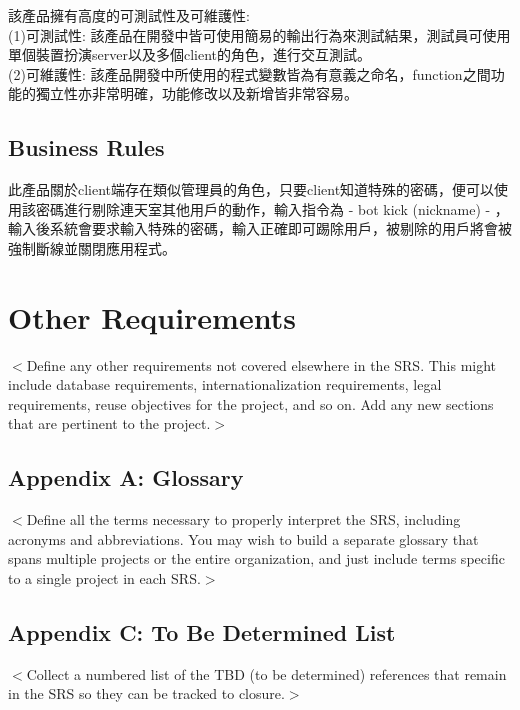 \documentclass{scrreprt}
\begin{document}
\begin{CJK}{UTF8}{bkai}
該產品擁有高度的可測試性及可維護性: \\
(1)可測試性: 該產品在開發中皆可使用簡易的輸出行為來測試結果，測試員可使用單個裝置扮演server以及多個client的角色，進行交互測試。\\
(2)可維護性: 該產品開發中所使用的程式變數皆為有意義之命名，function之間功能的獨立性亦非常明確，功能修改以及新增皆非常容易。\\

\section{Business Rules}
此產品關於client端存在類似管理員的角色，只要client知道特殊的密碼，便可以使用該密碼進行剔除連天室其他用戶的動作，輸入指令為 - bot kick (nickname) - ，輸入後系統會要求輸入特殊的密碼，輸入正確即可踢除用戶，被剔除的用戶將會被強制斷線並關閉應用程式。


\chapter{Other Requirements}
$<$Define any other requirements not covered elsewhere in the SRS. This might 
include database requirements, internationalization requirements, legal 
requirements, reuse objectives for the project, and so on. Add any new sections 
that are pertinent to the project.$>$

\section{Appendix A: Glossary}
$<$Define all the terms necessary to properly interpret the SRS, including 
acronyms and abbreviations. You may wish to build a separate glossary that spans 
multiple projects or the entire organization, and just include terms specific to 
a single project in each SRS.$>$


\section{Appendix C: To Be Determined List}
$<$Collect a numbered list of the TBD (to be determined) references that remain 
in the SRS so they can be tracked to closure.$>$

\end{CJK}
\end{document}
